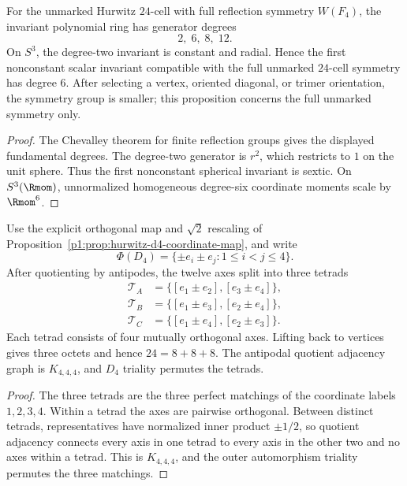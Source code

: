 \documentclass[11pt]{article}
\begin{document}
\begin{proposition}
\label{p1:prop:math-f4-sextic-obstruction}
For the unmarked Hurwitz \(24\)-cell with full reflection symmetry
\(W(F_4)\), the invariant polynomial ring has generator degrees
\[
 2,\;6,\;8,\;12.
\]
On \(S^3\), the degree-two invariant is constant and radial.  Hence the first
nonconstant scalar invariant compatible with the full unmarked \(24\)-cell
symmetry has degree \(6\).  After selecting a vertex, oriented diagonal, or
trimer orientation, the symmetry group is smaller; this proposition concerns
the full unmarked symmetry only.
\end{proposition}

\begin{proof}
The Chevalley theorem for finite reflection groups gives the displayed
fundamental degrees.  The degree-two generator is \(r^2\), which restricts to
\(1\) on the unit sphere.  Thus the first nonconstant spherical invariant is
sextic.  On \(S^3(\Rmom)\), unnormalized homogeneous degree-six coordinate
moments scale by \(\Rmom^6\).
\end{proof}

\begin{proposition}
\label{p1:prop:math-triality-octets-k444}
Use the explicit orthogonal map and \(\sqrt2\) rescaling of
Proposition~\ref{p1:prop:hurwitz-d4-coordinate-map}, and write
\[
 \Phi(D_4)=\{\pm e_i\pm e_j:1\le i<j\le4\}.
\]
After quotienting by antipodes, the twelve axes split into three tetrads
\[
\begin{aligned}
\mathcal T_A&=\{[e_1\pm e_2],[e_3\pm e_4]\},\\
\mathcal T_B&=\{[e_1\pm e_3],[e_2\pm e_4]\},\\
\mathcal T_C&=\{[e_1\pm e_4],[e_2\pm e_3]\}.
\end{aligned}
\]
Each tetrad consists of four mutually orthogonal axes.  Lifting back to
vertices gives three octets and hence \(24=8+8+8\).  The antipodal quotient
adjacency graph is \(K_{4,4,4}\), and \(D_4\) triality permutes the tetrads.
\end{proposition}

\begin{proof}
The three tetrads are the three perfect matchings of the coordinate labels
\(1,2,3,4\).  Within a tetrad the axes are pairwise orthogonal.  Between
distinct tetrads, representatives have normalized inner product \(\pm1/2\),
so quotient adjacency connects every axis in one tetrad to every axis in the
other two and no axes within a tetrad.  This is \(K_{4,4,4}\), and the outer
automorphism triality permutes the three matchings.
\end{proof}
\end{document}
